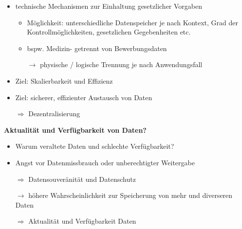 \begin{itemize}
    \item technische Mechanismen zur Einhaltung gesetzlicher Vorgaben
    \begin{itemize}
        \item Möglichkeit: unterschiedliche Datenspeicher je nach Kontext, Grad der Kontrollmöglichkeiten, gesetzlichen Gegebenheiten etc.
        \item bspw. Medizin- getrennt von Bewerbungsdaten
        \item[$\to$] physische / logische Trennung je nach Anwendungsfall
    \end{itemize}
    \item Ziel: Skalierbarkeit und Effizienz
    \item Ziel: sicherer, effizienter Austausch von Daten
    \item[$\Rightarrow$] Dezentralisierung
\end{itemize}

\vspace{1em}

\textbf{Aktualität und Verfügbarkeit von Daten?}
\begin{itemize}
    \item Warum veraltete Daten und schlechte Verfügbarkeit?
    \item Angst vor Datenmissbrauch oder unberechtigter Weitergabe
    \item[$\Rightarrow$] Datensouveränität und Datenschutz
    \item[$\to$] höhere Wahrscheinlichkeit zur Speicherung von mehr und diverseren Daten
    \item[$\Rightarrow$] Aktualität und Verfügbarkeit Daten
\end{itemize}

\vspace{1em}

